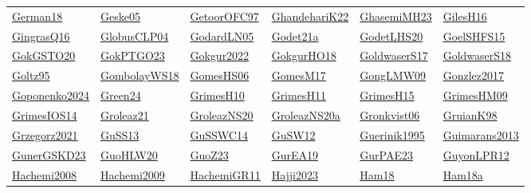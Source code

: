 \begin{longtable}{*{6}{l}}
\hyperref[detail:German18]{German18} & \hyperref[detail:Geske05]{Geske05} & \hyperref[detail:GetoorOFC97]{GetoorOFC97} & \hyperref[detail:GhandehariK22]{GhandehariK22} & \hyperref[detail:GhasemiMH23]{GhasemiMH23} & \hyperref[detail:GilesH16]{GilesH16}\\ 
\hyperref[detail:GingrasQ16]{GingrasQ16} & \hyperref[detail:GlobusCLP04]{GlobusCLP04} & \hyperref[detail:GodardLN05]{GodardLN05} & \hyperref[detail:Godet21a]{Godet21a} & \hyperref[detail:GodetLHS20]{GodetLHS20} & \hyperref[detail:GoelSHFS15]{GoelSHFS15}\\ 
\hyperref[detail:GokGSTO20]{GokGSTO20} & \hyperref[detail:GokPTGO23]{GokPTGO23} & \hyperref[detail:Gokgur2022]{Gokgur2022} & \hyperref[detail:GokgurHO18]{GokgurHO18} & \hyperref[detail:GoldwaserS17]{GoldwaserS17} & \hyperref[detail:GoldwaserS18]{GoldwaserS18}\\ 
\hyperref[detail:Goltz95]{Goltz95} & \hyperref[detail:GombolayWS18]{GombolayWS18} & \hyperref[detail:GomesHS06]{GomesHS06} & \hyperref[detail:GomesM17]{GomesM17} & \hyperref[detail:GongLMW09]{GongLMW09} & \hyperref[detail:Gonzlez2017]{Gonzlez2017}\\ 
\hyperref[detail:Goponenko2024]{Goponenko2024} & \hyperref[detail:Green24]{Green24} & \hyperref[detail:GrimesH10]{GrimesH10} & \hyperref[detail:GrimesH11]{GrimesH11} & \hyperref[detail:GrimesH15]{GrimesH15} & \hyperref[detail:GrimesHM09]{GrimesHM09}\\ 
\hyperref[detail:GrimesIOS14]{GrimesIOS14} & \hyperref[detail:Groleaz21]{Groleaz21} & \hyperref[detail:GroleazNS20]{GroleazNS20} & \hyperref[detail:GroleazNS20a]{GroleazNS20a} & \hyperref[detail:Gronkvist06]{Gronkvist06} & \hyperref[detail:GruianK98]{GruianK98}\\ 
\hyperref[detail:Grzegorz2021]{Grzegorz2021} & \hyperref[detail:GuSS13]{GuSS13} & \hyperref[detail:GuSSWC14]{GuSSWC14} & \hyperref[detail:GuSW12]{GuSW12} & \hyperref[detail:Guerinik1995]{Guerinik1995} & \hyperref[detail:Guimarans2013]{Guimarans2013}\\ 
\hyperref[detail:GunerGSKD23]{GunerGSKD23} & \hyperref[detail:GuoHLW20]{GuoHLW20} & \hyperref[detail:GuoZ23]{GuoZ23} & \hyperref[detail:GurEA19]{GurEA19} & \hyperref[detail:GurPAE23]{GurPAE23} & \hyperref[detail:GuyonLPR12]{GuyonLPR12}\\ 
\hyperref[detail:Hachemi2008]{Hachemi2008} & \hyperref[detail:Hachemi2009]{Hachemi2009} & \hyperref[detail:HachemiGR11]{HachemiGR11} & \hyperref[detail:Hajji2023]{Hajji2023} & \hyperref[detail:Ham18]{Ham18} & \hyperref[detail:Ham18a]{Ham18a}\\ 

\end{longtable}
